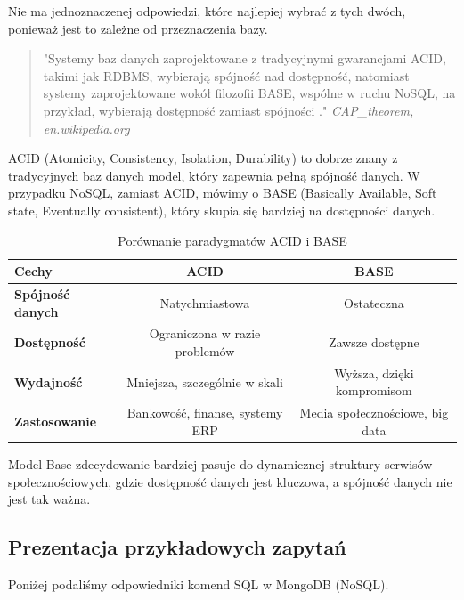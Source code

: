 \documentclass{article}
\begin{document}
Nie ma jednoznaczenej odpowiedzi, które najlepiej wybrać z tych dwóch, ponieważ jest to zależne od przeznaczenia bazy.

\begin{quotation}
    "Systemy baz danych zaprojektowane z tradycyjnymi gwarancjami ACID, takimi jak RDBMS, wybierają spójność nad dostępność, natomiast systemy zaprojektowane wokół filozofii BASE, wspólne w ruchu NoSQL, na przykład, wybierają dostępność zamiast spójności \cite{wikiAboutBase}."
    \textit{CAP\_theorem, en.wikipedia.org}
\end{quotation}

ACID (Atomicity, Consistency, Isolation, Durability) to dobrze znany z tradycyjnych baz danych model, który zapewnia pełną spójność danych. W przypadku NoSQL, zamiast ACID, mówimy o BASE (Basically Available, Soft state, Eventually consistent), który skupia się bardziej na dostępności danych.

\begin{table}[h!]
    \centering
    \begin{tabular}{|l|c|c|}
        \hline
        \textbf{Cechy}           & \textbf{ACID}                   & \textbf{BASE}                   \\ \hline
        \textbf{Spójność danych} & Natychmiastowa                  & Ostateczna                      \\ \hline
        \textbf{Dostępność}      & Ograniczona w razie problemów   & Zawsze dostępne                 \\ \hline
        \textbf{Wydajność}       & Mniejsza, szczególnie w skali   & Wyższa, dzięki kompromisom      \\ \hline
        \textbf{Zastosowanie}    & Bankowość, finanse, systemy ERP & Media społecznościowe, big data \\ \hline
    \end{tabular}
    \caption{Porównanie paradygmatów ACID i BASE}
    \label{tab:acid_base_comparison}
\end{table}

Model Base zdecydowanie bardziej pasuje do dynamicznej struktury serwisów społecznościowych, gdzie dostępność danych jest kluczowa, a spójność danych nie jest tak ważna.

\subsection{Prezentacja przykładowych zapytań}

Poniżej podaliśmy odpowiedniki komend SQL w MongoDB (NoSQL).
\end{document}
